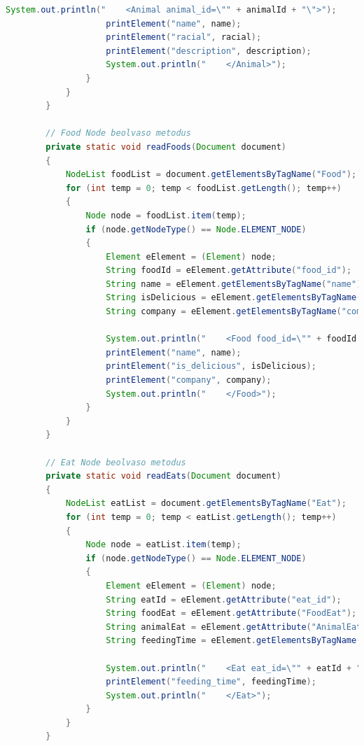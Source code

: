 \documentclass[12pt]{report}
\begin{document}
\begin{lstlisting}[caption={DOMReadKLNSPG.java} adatolvasó program, language=Java]
					System.out.println("    <Animal animal_id=\"" + animalId + "\">");
					printElement("name", name);
					printElement("racial", racial);
					printElement("description", description);
					System.out.println("    </Animal>");
				}
			}
		}
		
		// Food Node beolvaso metodus
		private static void readFoods(Document document) 
		{
			NodeList foodList = document.getElementsByTagName("Food");
			for (int temp = 0; temp < foodList.getLength(); temp++) 
			{
				Node node = foodList.item(temp);
				if (node.getNodeType() == Node.ELEMENT_NODE) 
				{
					Element eElement = (Element) node;
					String foodId = eElement.getAttribute("food_id");
					String name = eElement.getElementsByTagName("name").item(0).getTextContent();
					String isDelicious = eElement.getElementsByTagName("is_delicious").item(0).getTextContent();
					String company = eElement.getElementsByTagName("company").item(0).getTextContent();
					
					System.out.println("    <Food food_id=\"" + foodId + "\">");
					printElement("name", name);
					printElement("is_delicious", isDelicious);
					printElement("company", company);
					System.out.println("    </Food>");
				}
			}
		}
		
		// Eat Node beolvaso metodus
		private static void readEats(Document document) 
		{
			NodeList eatList = document.getElementsByTagName("Eat");
			for (int temp = 0; temp < eatList.getLength(); temp++) 
			{
				Node node = eatList.item(temp);
				if (node.getNodeType() == Node.ELEMENT_NODE) 
				{
					Element eElement = (Element) node;
					String eatId = eElement.getAttribute("eat_id");
					String foodEat = eElement.getAttribute("FoodEat");
					String animalEat = eElement.getAttribute("AnimalEat");
					String feedingTime = eElement.getElementsByTagName("feeding_time").item(0).getTextContent();
					
					System.out.println("    <Eat eat_id=\"" + eatId + "\" FoodEat=\"" + foodEat + "\" AnimalEat=\"" + animalEat + "\">");
					printElement("feeding_time", feedingTime);
					System.out.println("    </Eat>");
				}
			}
		}
		

\end{lstlisting}
\end{document}

